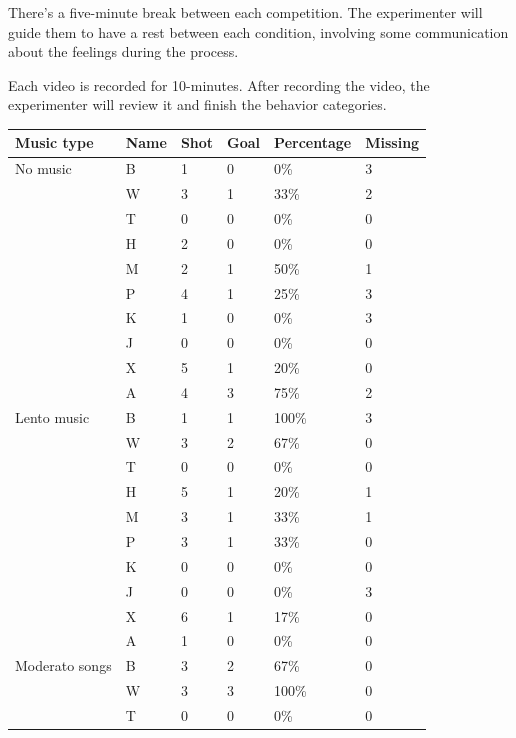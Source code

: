 \documentclass[man,floatsintext]{apa7}
\begin{document}
There's a five-minute break between each competition. The experimenter will guide them to have a rest between each condition, involving some communication about the feelings during the process.

Each video is recorded for 10-minutes. After recording the video, the experimenter will review it and finish the behavior categories.

\begin{table}[h]
\centering
    \begin{tabular}{@{}llllll@{}}
        \toprule
	Music type & Name & Shot & Goal & Percentage & Missing\\
        \midrule
        No music & B & 1 & 0 & 0\% & 3 \\
                 & W & 3 & 1 & 33\% & 2 \\
                 & T & 0 & 0 & 0\% & 0 \\
                 & H & 2 & 0 & 0\% & 0 \\
                 & M & 2 & 1 & 50\% & 1 \\
                 & P & 4 & 1 & 25\% & 3 \\
                 & K & 1 & 0 & 0\% & 3 \\
                 & J & 0 & 0 & 0\% & 0 \\
                 & X & 5 & 1 & 20\% & 0 \\
                 & A & 4 & 3 & 75\% & 2 \\
        \midrule
        Lento music & B & 1 & 1 & 100\% & 3 \\
                    & W & 3 & 2 & 67\% & 0 \\
                    & T & 0 & 0 & 0\% & 0 \\
                    & H & 5 & 1 & 20\% & 1 \\
                    & M & 3 & 1 & 33\% & 1 \\
                    & P & 3 & 1 & 33\% & 0 \\
                    & K & 0 & 0 & 0\% & 0 \\
                    & J & 0 & 0 & 0\% & 3 \\
                    & X & 6 & 1 & 17\% & 0 \\
                    & A & 1 & 0 & 0\% & 0 \\
        \midrule
        Moderato songs & B & 3 & 2 & 67\% & 0 \\
                       & W & 3 & 3 & 100\% & 0 \\
                       & T & 0 & 0 & 0\% & 0 \\

\end{tabular}
\end{table}
\end{document}

